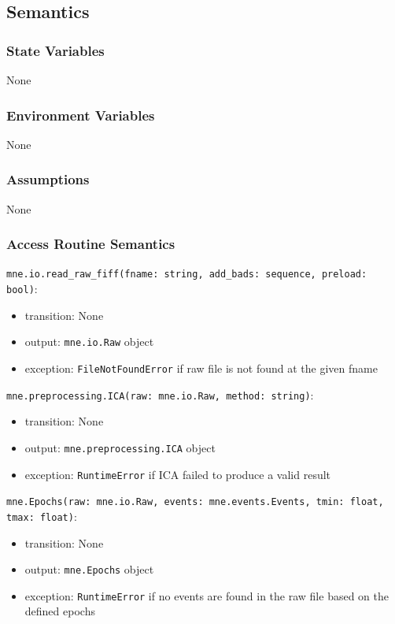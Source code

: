 \documentclass[12pt, titlepage]{article}
\begin{document}
\subsection{Semantics}


\subsubsection{State Variables}


None




\subsubsection{Environment Variables}


None




\subsubsection{Assumptions}


None




\subsubsection{Access Routine Semantics}


\noindent \lstinline|mne.io.read_raw_fiff(fname: string, add_bads: sequence, preload: bool)|:
\begin{itemize}
    \item transition: None
    \item output: \lstinline|mne.io.Raw| object
    \item exception: \lstinline|FileNotFoundError| if raw file is not found at the given fname
\end{itemize}


\noindent \lstinline|mne.preprocessing.ICA(raw: mne.io.Raw, method: string)|:
\begin{itemize}
    \item transition: None
    \item output: \lstinline|mne.preprocessing.ICA| object
    \item exception: \lstinline|RuntimeError| if ICA failed to produce a valid result
\end{itemize}


\noindent \lstinline|mne.Epochs(raw: mne.io.Raw, events: mne.events.Events, tmin: float, tmax: float)|:
\begin{itemize}
    \item transition: None
    \item output: \lstinline|mne.Epochs| object
    \item exception: \lstinline|RuntimeError| if no events are found in the raw file based on the defined epochs
\end{itemize}
\end{document}
